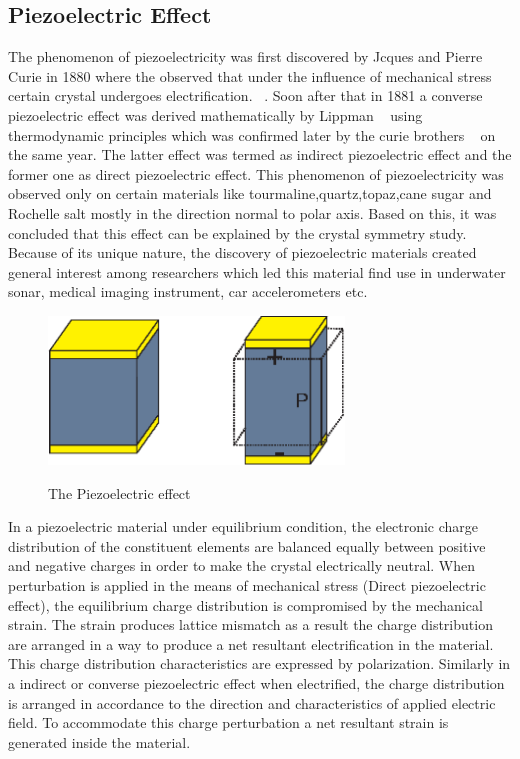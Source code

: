\subsection{Piezoelectric Effect}
The phenomenon of piezoelectricity was first discovered by Jcques and Pierre Curie in 1880 where the observed that under the influence of mechanical stress certain crystal undergoes electrification. ~\cite{CurieP.1880.CRF.294}. Soon after that in 1881 a converse piezoelectric effect was derived mathematically by Lippman ~\cite{G.1881.AdCedP5s.145} using thermodynamic principles which was confirmed later by the curie brothers ~\cite{CurieP.1881.CRF.1137} on the same year. The latter effect was termed as indirect piezoelectric effect and the former one as direct piezoelectric effect. This phenomenon of piezoelectricity was observed only on certain materials like tourmaline,quartz,topaz,cane sugar and Rochelle salt mostly in the direction normal to polar axis. Based on this, it was concluded that this effect can be explained by the crystal symmetry study. Because of its unique nature, the discovery of piezoelectric materials created general interest among researchers  which led this material find use in underwater sonar, medical imaging instrument, car accelerometers etc.
\begin{figure}[t]
\centering
	\includegraphics[width=0.7\textwidth]{Piezoelectric_final.eps}\\
	\caption[The Piezoelectric effect]{The Piezoelectric effect}\label{fig:The Piezoelectric effect}
\end{figure}
In a piezoelectric material under equilibrium condition, the electronic charge distribution of the constituent elements are balanced equally between positive and negative charges in order to make the crystal electrically neutral. When perturbation is applied in the means of mechanical stress (Direct piezoelectric effect), the equilibrium charge distribution is compromised by the mechanical strain. The strain produces lattice mismatch as a result the charge distribution are arranged in a way to produce a net resultant electrification in the material. This charge distribution characteristics are expressed by polarization. Similarly in a indirect or converse piezoelectric effect when electrified, the charge distribution is arranged in accordance to the direction and characteristics of applied electric field. To accommodate this charge perturbation a net resultant strain is generated inside the material.


